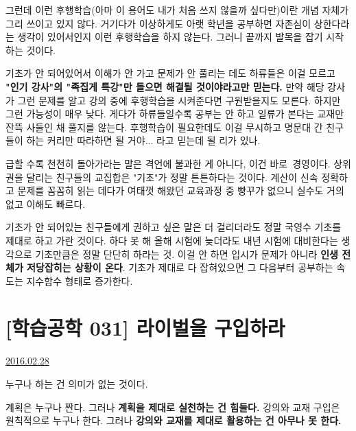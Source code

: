 그런데 이런 후행학습(아마 이 용어도 내가 처음 쓰지 않을까 싶다만)이란 개념 자체가 그리 쓰이고 있지 않다.
거기다가 이상하게도 아랫 학년을 공부하면 자존심이 상한다라는 생각이 있어서인지 이런 후행학습을 하지 않는다.
그러니 끝까지 발목을 잡기 시작하는 것이다.
\vspace{5mm}

기초가 안 되어있어서 이해가 안 가고 문제가 안 풀리는 데도
하류들은 이걸 모르고 \textbf{"인기 강사"의 "족집게 특강"만 들으면 해결될 것이야라고만 믿는다.}
만약 해당 강사가 그런 문제를 알고 강의 중에 후행학습을 시켜준다면 구원받을지도 모른다.
하지만 그런 가능성이 매우 낮다.
게다가 하류들일수록 공부는 안 하고 일류가 본다는 교재만 잔뜩 사들인 채 풀지를 않는다.
후행학습이 필요한데도 이걸 무시하고 명문대 간 친구들이 하는 커리만 따라하면 될 거야... 라고 믿는데 될 리가 있나.
\vspace{5mm}

급할 수록 천천히 돌아가라는 말은 격언에 불과한 게 아니다, 이건 바로 경영이다.
상위권을 달리는 친구들의 교집합은 "기초"가 정말 튼튼하다는 것이다.
계산이 신속 정확하고 문제를 꼼꼼히 읽는 데다가 여태껏 해왔던 교육과정 중 빵꾸가 없으니 실수도 거의 없고 이해도 빠르다.
\vspace{5mm}

기초가 안 되어있는 친구들에게 권하고 싶은 말은 더 걸리더라도 정말 국영수 기초를 제대로 하고 가란 것이다.
하다 못 해 올해 시험에 늦더라도 내년 시험에 대비한다는 생각으로 기초만큼은 정말 단단히 하라는 것.
이걸 안 하면 입시가 문제가 아니라 \textbf{인생 전체가 저당잡히는 상황이 온다}.
기초가 제대로 다 잡혀있으면 그 다음부터 공부하는 속도는 지수함수 형태로 증가한다.
\vspace{5mm}






\section{[학습공학 031] 라이벌을 구입하라}
\href{https://www.kockoc.com/Apoc/655573}{2016.02.28}

\vspace{5mm}

누구나 하는 건 의미가 없는 것이다.
\vspace{5mm}

계획은 누구나 짠다. 그러나 \textbf{계획을 제대로 실천하는 건 힘들다.}
강의와 교재 구입은 원칙적으로 누구나 한다.
그러나 \textbf{강의와 교재를 제대로 활용하는 건 아무나 못 한다.}
\vspace{5mm}


